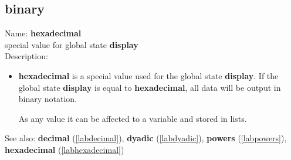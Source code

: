 \subsection{binary}
\label{labbinary}
\noindent Name: \textbf{hexadecimal}\\
special value for global state \textbf{display}\\

\noindent Description: \begin{itemize}

\item \textbf{hexadecimal} is a special value used for the global state \textbf{display}.  If
   the global state \textbf{display} is equal to \textbf{hexadecimal}, all data will be
   output in binary notation.
    
   As any value it can be affected to a variable and stored in lists.
\end{itemize}
See also: \textbf{decimal} (\ref{labdecimal}), \textbf{dyadic} (\ref{labdyadic}), \textbf{powers} (\ref{labpowers}), \textbf{hexadecimal} (\ref{labhexadecimal})
